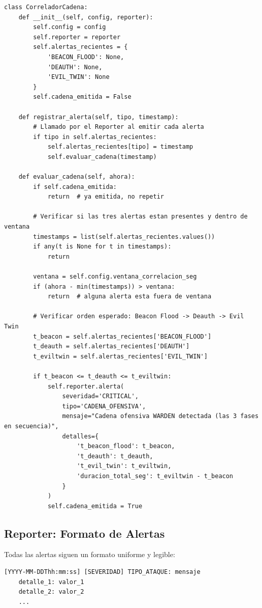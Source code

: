 \documentclass[11pt,a4paper]{article}
\begin{document}
\begin{lstlisting}
class CorreladorCadena:
    def __init__(self, config, reporter):
        self.config = config
        self.reporter = reporter
        self.alertas_recientes = {
            'BEACON_FLOOD': None,
            'DEAUTH': None,
            'EVIL_TWIN': None
        }
        self.cadena_emitida = False

    def registrar_alerta(self, tipo, timestamp):
        # Llamado por el Reporter al emitir cada alerta
        if tipo in self.alertas_recientes:
            self.alertas_recientes[tipo] = timestamp
            self.evaluar_cadena(timestamp)

    def evaluar_cadena(self, ahora):
        if self.cadena_emitida:
            return  # ya emitida, no repetir

        # Verificar si las tres alertas estan presentes y dentro de ventana
        timestamps = list(self.alertas_recientes.values())
        if any(t is None for t in timestamps):
            return

        ventana = self.config.ventana_correlacion_seg
        if (ahora - min(timestamps)) > ventana:
            return  # alguna alerta esta fuera de ventana

        # Verificar orden esperado: Beacon Flood -> Deauth -> Evil Twin
        t_beacon = self.alertas_recientes['BEACON_FLOOD']
        t_deauth = self.alertas_recientes['DEAUTH']
        t_eviltwin = self.alertas_recientes['EVIL_TWIN']

        if t_beacon <= t_deauth <= t_eviltwin:
            self.reporter.alerta(
                severidad='CRITICAL',
                tipo='CADENA_OFENSIVA',
                mensaje="Cadena ofensiva WARDEN detectada (las 3 fases en secuencia)",
                detalles={
                    't_beacon_flood': t_beacon,
                    't_deauth': t_deauth,
                    't_evil_twin': t_eviltwin,
                    'duracion_total_seg': t_eviltwin - t_beacon
                }
            )
            self.cadena_emitida = True
\end{lstlisting}

\subsection{Reporter: Formato de Alertas}

Todas las alertas siguen un formato uniforme y legible:

\begin{lstlisting}
[YYYY-MM-DDThh:mm:ss] [SEVERIDAD] TIPO_ATAQUE: mensaje
    detalle_1: valor_1
    detalle_2: valor_2
    ...
\end{lstlisting}
\end{document}
